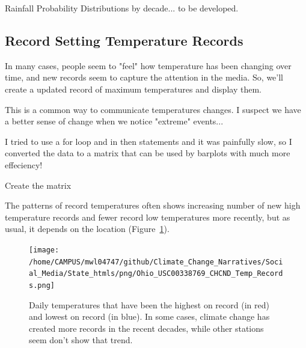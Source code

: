 \documentclass{article}\usepackage[]{graphicx}\usepackage[]{color}
\makeatletter
\newenvironment{kframe}{%
 \def\at@end@of@kframe{}%
 \ifinner\ifhmode%
  \def\at@end@of@kframe{\end{minipage}}%
  \begin{minipage}{\columnwidth}%
 \fi\fi%
 \def\FrameCommand##1{\hskip\@totalleftmargin \hskip-\fboxsep
 \colorbox{shadecolor}{##1}\hskip-\fboxsep
     \hskip-\linewidth \hskip-\@totalleftmargin \hskip\columnwidth}%
 \MakeFramed {\advance\hsize-\width
   \@totalleftmargin\z@ \linewidth\hsize
   \@setminipage}}%
 {\par\unskip\endMakeFramed%
 \at@end@of@kframe}
\newenvironment{knitrout}{}{} %
\makeatother
\begin{document}
Rainfall Probability Distributions by decade... to be developed.





\subsection{Record Setting Temperature Records}

In many cases, people seem to "feel" how temperature has been changing over time, and new records seem to capture the attention in the media. So, we'll create a updated record of maximum temperatures and display them. 





This is a common way to communicate temperatures changes. I suspect we have a better sense of change when we notice "extreme" events...






I tried to use a for loop and in then statements and it was painfully slow, so I converted the data to a matrix that can be used by barplots with much more effeciency!

Create the matrix
\begin{knitrout}
\color{fgcolor}\begin{kframe}


{\ttfamily\noindent\bfseries\color{errorcolor}{\#\# Error in TMAX.mat.noleap[j, year.seq\$Col[year.seq\$Year == i]] <- CHCND.noleap\$TMAX[CHCND.noleap\$Year == : replacement has length zero}}\end{kframe}
\end{knitrout}




The patterns of record temperatures often shows increasing number of new high temperature records  and fewer record low temperatures more recently, but as usual, it depends on the location (Figure~\ref{fig:Records}).
\begin{figure}
\texttt{[image: /home/CAMPUS/mwl04747/github/Climate\_Change\_Narratives/Social\_Media/State\_htmls/png/Ohio\_USC00338769\_CHCND\_Temp\_Records.png]}
\caption{Daily temperatures that have been the highest on record (in red) and lowest on record (in blue). In some cases, climate change has created more records in the recent decades, while other stations seem don't show that trend.}
\label{fig:Records}
\end{figure}
\end{document}
